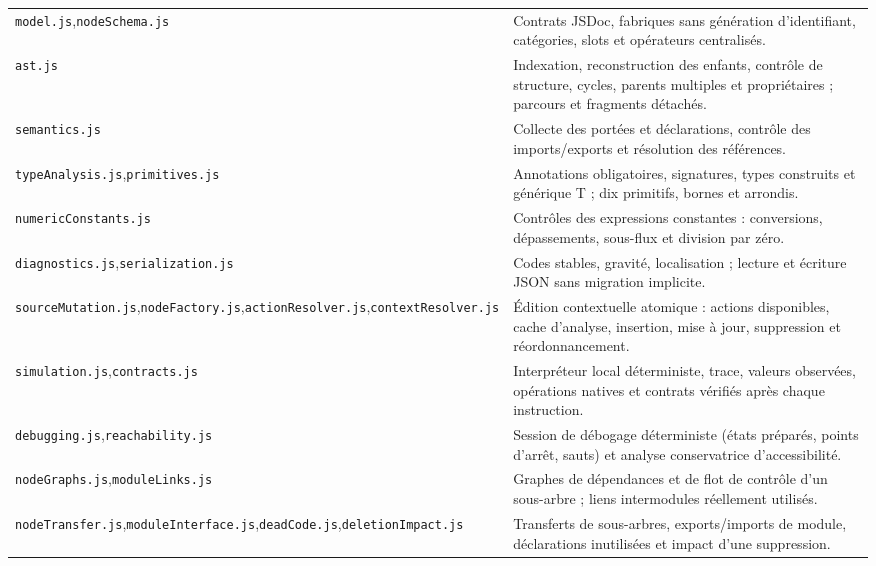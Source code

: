 \documentclass[11pt,a4paper]{article}
\newcommand{\code}[1]{\texttt{#1}}
\begin{document}
\begin{tabular}{@{}p{43mm}p{117mm}@{}}
\code{model.js},\newline\code{nodeSchema.js} & Contrats JSDoc, fabriques sans génération
d'identifiant, catégories, slots et opérateurs centralisés.\\[3pt]
\code{ast.js} & Indexation, reconstruction des enfants, contrôle de structure,
cycles, parents multiples et propriétaires ; parcours et fragments détachés.\\[3pt]
\code{semantics.js} & Collecte des portées et déclarations, contrôle des
imports/exports et résolution des références.\\[3pt]
\code{typeAnalysis.js},\newline\code{primitives.js} & Annotations obligatoires,
signatures, types construits et générique T ; dix primitifs, bornes et
arrondis.\\[3pt]
\code{numericConstants.js} & Contrôles des expressions constantes : conversions,
dépassements, sous-flux et division par zéro.\\[3pt]
\code{diagnostics.js},\newline\code{serialization.js} & Codes stables, gravité,
localisation ; lecture et écriture JSON sans migration implicite.\\[3pt]
\code{sourceMutation.js},\newline\code{nodeFactory.js},\newline\code{actionResolver.js},\newline\code{contextResolver.js} & Édition contextuelle
atomique : actions disponibles, cache d'analyse, insertion, mise à jour,
suppression et réordonnancement.\\[3pt]
\code{simulation.js},\newline\code{contracts.js} & Interpréteur local déterministe,
trace, valeurs observées, opérations natives et contrats vérifiés après chaque instruction.\\[3pt]
\code{debugging.js},\newline\code{reachability.js} & Session de débogage
déterministe (états préparés, points d'arrêt, sauts) et analyse conservatrice d'accessibilité.\\[3pt]
\code{nodeGraphs.js},\newline\code{moduleLinks.js} & Graphes de dépendances et de
flot de contrôle d'un sous-arbre ; liens intermodules réellement utilisés.\\[3pt]
\code{nodeTransfer.js},\newline\code{moduleInterface.js},\newline\code{deadCode.js},\newline\code{deletionImpact.js} & Transferts de sous-arbres,
exports/imports de module, déclarations inutilisées et impact d'une suppression.\\
\end{tabular}
\end{document}
